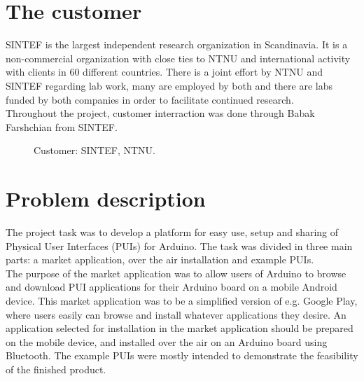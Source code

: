 \section{The customer}
\label{sec:sintef}
\label{sec:ntnu}
SINTEF is the largest independent research organization in Scandinavia. It is a non-commercial organization with close ties to NTNU and international activity with clients in 60 different countries. There is a joint effort by NTNU and SINTEF regarding lab work, many are employed by both and there are labs funded by both companies in order to facilitate continued research. \\
\newline
Throughout the project, customer interraction was done through Babak Farshchian from SINTEF.\\
\begin{figure}[H]
%
\hfill
{}%
\caption{Customer: \protect{\ref{fig:sintef}} SINTEF, \protect{\ref{fig:ntnu}} NTNU.}
\end{figure}

\section{Problem description}
The project task was to develop a platform for easy use, setup and sharing of Physical User Interfaces (PUIs) for Arduino. The task was divided in three main parts: a market application, over the air installation and example PUIs.\\
\newline
The purpose of the market application was to allow users of Arduino to browse and download PUI applications for their Arduino board on a mobile Android device. This market application was to be a simplified version of e.g. Google Play, where users easily can browse and install whatever applications they desire. An application selected for installation in the market application should be prepared on the mobile device, and installed over the air on an Arduino board using Bluetooth. The example PUIs were mostly intended to demonstrate the feasibility of the finished product.

